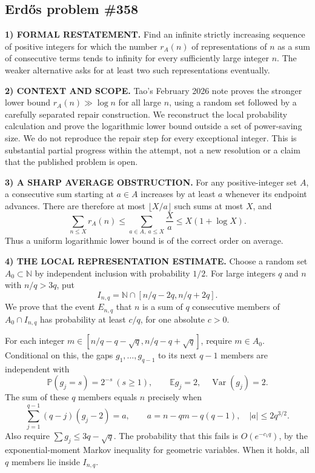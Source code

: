 \subsection*{Erd\H{o}s problem \#358}

\noindent\textbf{1) FORMAL RESTATEMENT.}
Find an infinite strictly increasing sequence of positive integers for which the number $r_A(n)$ of representations of $n$ as a sum of consecutive terms tends to infinity for every sufficiently large integer $n$. The weaker alternative asks for at least two such representations eventually.

\noindent\textbf{2) CONTEXT AND SCOPE.}
Tao's February 2026 note proves the stronger lower bound $r_A(n)\gg\log n$ for all large $n$, using a random set followed by a carefully separated repair construction. We reconstruct the local probability calculation and prove the logarithmic lower bound outside a set of power-saving size. We do not reproduce the repair step for every exceptional integer. This is substantial partial progress within the attempt, not a new resolution or a claim that the published problem is open.

\noindent\textbf{3) A SHARP AVERAGE OBSTRUCTION.}
For any positive-integer set $A$, a consecutive sum starting at $a\in A$ increases by at least $a$ whenever its endpoint advances. There are therefore at most $\lfloor X/a\rfloor$ such sums at most $X$, and
\[
 \sum_{n\le X}r_A(n)\le\sum_{a\in A,\ a\le X}\frac Xa
 \le X(1+\log X).
\]
Thus a uniform logarithmic lower bound is of the correct order on average.

\noindent\textbf{4) THE LOCAL REPRESENTATION ESTIMATE.}
Choose a random set $A_0\subset\mathbb N$ by independent inclusion with probability $1/2$. For large integers $q$ and $n$ with $n/q>3q$, put
\[
 I_{n,q}=\mathbb N\cap[n/q-2q,n/q+2q].
\]
We prove that the event $E_{n,q}$ that $n$ is a sum of $q$ consecutive members of $A_0\cap I_{n,q}$ has probability at least $c/q$, for one absolute $c>0$.

For each integer $m\in[n/q-q-\sqrt q,n/q-q+\sqrt q]$, require $m\in A_0$. Conditional on this, the gaps $g_1,\ldots,g_{q-1}$ to its next $q-1$ members are independent with
\[
 \mathbb P(g_j=s)=2^{-s}\ (s\ge1),\qquad
 \mathbb E g_j=2,\quad\operatorname{Var}(g_j)=2.
\]
The sum of these $q$ members equals $n$ precisely when
\[
 \sum_{j=1}^{q-1}(q-j)(g_j-2)=a,
 \qquad a=n-qm-q(q-1),\quad |a|\le2q^{3/2}. \tag{1}
\]
Also require $\sum g_j\le3q-\sqrt q$. The probability that this fails is $O(e^{-c_1q})$, by the exponential-moment Markov inequality for geometric variables. When it holds, all $q$ members lie inside $I_{n,q}$.

